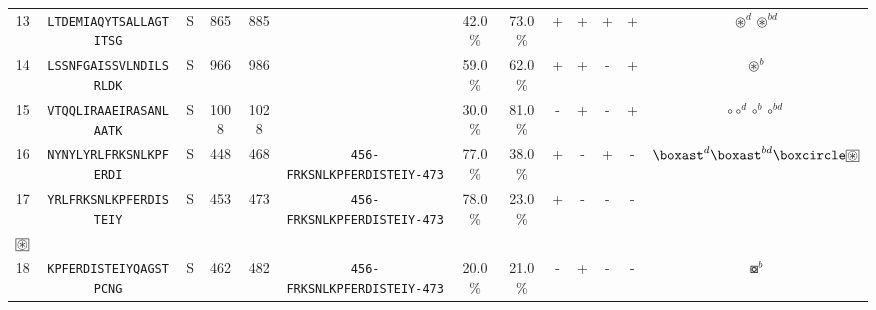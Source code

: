 \begin{tabular}{rcccccccccccc}
13 &  \texttt{LTDEMIAQYTSALLAGTITSG} &       S &    865 &   885 &                                                                  &                          42.0\% &                           73.0\% &          + &           + &          + &           + &                                                                                                 $ \circledast^d \circledast^{bd} $ \\
14 &  \texttt{LSSNFGAISSVLNDILSRLDK} &       S &    966 &   986 &                                                                  &                          59.0\% &                           62.0\% &          + &           + &          - &           + &                                                                                                                  $ \circledast^b $ \\
15 &  \texttt{VTQQLIRAAEIRASANLAATK} &       S &   1008 &  1028 &                                                                  &                          30.0\% &                           81.0\% &          - &           + &          - &           + &                                                                                               $ \circ \circ^d \circ^b \circ^{bd} $ \\
16 &  \texttt{NYNYLYRLFRKSNLKPFERDI} &       S &    448 &   468 &  \texttt{{\scriptsize 456-}FRKSNLKPFERDISTEIY{\scriptsize -473}} &                          77.0\% &                           38.0\% &          + &           - &          + &           - &                                              $ \boxast^d \boxast^{bd} \boxcircle \setlength{\fboxsep}{0.5pt} \boxed{\circledast} $ \\
17 &  \texttt{YRLFRKSNLKPFERDISTEIY} &       S &    453 &   473 &  \texttt{{\scriptsize 456-}FRKSNLKPFERDISTEIY{\scriptsize -473}} &                          78.0\% &                           23.0\% &          + &           - &          - &           - &                    \Centerstack{  $\boxempty \boxast \boxast^b \boxcircle$ \\  $\setlength{\fboxsep}{0.5pt} \boxed{\circledast}$ } \\
18 &  \texttt{KPFERDISTEIYQAGSTPCNG} &       S &    462 &   482 &  \texttt{{\scriptsize 456-}FRKSNLKPFERDISTEIY{\scriptsize -473}} &                          20.0\% &                           21.0\% &          - &           + &          - &           - &                                                                                                                   $ \boxcircle^b $ \\

\end{tabular}
